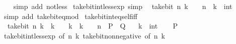 \begin{isabellebody}
%
\isadelimproof
\ \ %
\endisadelimproof
%
\isatagproof
{}\isamarkupfalse%
\ {\isacharparenleft}{\kern0pt}simp\ add{\isacharcolon}{\kern0pt}\ not{\isacharunderscore}{\kern0pt}less{\isacharparenright}{\kern0pt}%
\endisatagproof
{\isafoldproof}%
%
\isadelimproof
\isanewline
%
\endisadelimproof
\isanewline
{}\isamarkupfalse%
\ take{\isacharunderscore}{\kern0pt}bit{\isacharunderscore}{\kern0pt}int{\isacharunderscore}{\kern0pt}less{\isacharunderscore}{\kern0pt}exp\ {\isacharbrackleft}{\kern0pt}simp{\isacharbrackright}{\kern0pt}{\isacharcolon}{\kern0pt}\isanewline
\ \ {\isacartoucheopen}take{\isacharunderscore}{\kern0pt}bit\ n\ k\ {\isacharless}{\kern0pt}\ {}\ {\isacharcircum}{\kern0pt}\ n{\isacartoucheclose}\ \ k\ {\isacharcolon}{\kern0pt}{\isacharcolon}{\kern0pt}\ int\isanewline
%
\isadelimproof
\ \ %
\endisadelimproof
%
\isatagproof
{}\isamarkupfalse%
\ {\isacharparenleft}{\kern0pt}simp\ add{\isacharcolon}{\kern0pt}\ take{\isacharunderscore}{\kern0pt}bit{\isacharunderscore}{\kern0pt}eq{\isacharunderscore}{\kern0pt}mod{\isacharparenright}{\kern0pt}%
\endisatagproof
{\isafoldproof}%
%
\isadelimproof
\isanewline
%
\endisadelimproof
\isanewline
{}\isamarkupfalse%
\ take{\isacharunderscore}{\kern0pt}bit{\isacharunderscore}{\kern0pt}int{\isacharunderscore}{\kern0pt}eq{\isacharunderscore}{\kern0pt}self{\isacharunderscore}{\kern0pt}iff{\isacharcolon}{\kern0pt}\isanewline
\ \ {\isacartoucheopen}take{\isacharunderscore}{\kern0pt}bit\ n\ k\ {\isacharequal}{\kern0pt}\ k\ {\isasymlongleftrightarrow}\ {}\ {\isasymle}\ k\ {\isasymand}\ k\ {\isacharless}{\kern0pt}\ {}\ {\isacharcircum}{\kern0pt}\ n{\isacartoucheclose}\ {\isacharparenleft}{\kern0pt}\ {\isacartoucheopen}{\isacharquery}{\kern0pt}P\ {\isasymlongleftrightarrow}\ {\isacharquery}{\kern0pt}Q{\isacartoucheclose}{\isacharparenright}{\kern0pt}\isanewline
\ \ \ k\ {\isacharcolon}{\kern0pt}{\isacharcolon}{\kern0pt}\ int\isanewline
%
\isadelimproof
%
\endisadelimproof
%
\isatagproof
{}\isamarkupfalse%
\isanewline
\ \ \isamarkupfalse%
\ {\isacharquery}{\kern0pt}P\isanewline
\ \ \isamarkupfalse%
\ \isamarkupfalse%
\ take{\isacharunderscore}{\kern0pt}bit{\isacharunderscore}{\kern0pt}int{\isacharunderscore}{\kern0pt}less{\isacharunderscore}{\kern0pt}exp\ {\isacharbrackleft}{\kern0pt}of\ n\ k{\isacharbrackright}{\kern0pt}\ take{\isacharunderscore}{\kern0pt}bit{\isacharunderscore}{\kern0pt}nonnegative\ {\isacharbrackleft}{\kern0pt}of\ n\ k{\isacharbrackright}{\kern0pt}\isanewline

\end{isabellebody}
